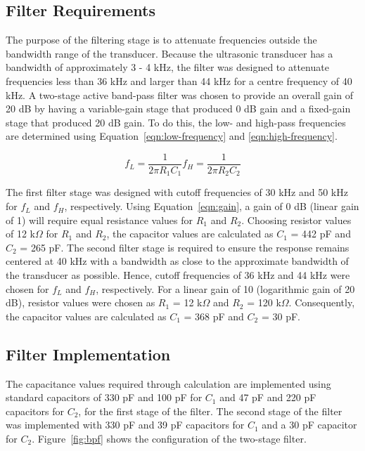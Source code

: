 \documentclass[class=report,11pt,crop=false]{standalone}
\begin{document}
\subsection{Filter Requirements}
The purpose of the filtering stage is to attenuate frequencies outside the bandwidth range of the transducer. Because the ultrasonic transducer has a bandwidth of approximately 3 - 4 kHz, the filter was designed to attenuate frequencies less than 36 kHz and larger than 44 kHz for a centre frequency of 40 kHz. A two-stage active band-pass filter was chosen to provide an overall gain of 20 dB by having a variable-gain stage that produced 0 dB gain and a fixed-gain stage that produced 20 dB gain. To do this, the low- and high-pass frequencies are determined using Equation~\ref{eqn:low-frequency} and \ref{eqn:high-frequency}.

\begin{subequations}
\begin{equation}
    f_L = \frac{1}{2\pi R_1 C_1}
    \label{eqn:low-frequency}
\end{equation}
\begin{equation}
    f_H = \frac{1}{2\pi R_2 C_2}
    \label{eqn:high-frequency}
\end{equation}
\end{subequations}

The first filter stage was designed with cutoff frequencies of 30 kHz and 50 kHz for $f_L$ and $f_H$, respectively. Using Equation~\ref{eqn:gain}, a gain of 0 dB (linear gain of 1) will require equal resistance values for $R_1$ and $R_2$. Choosing resistor values of 12 k$\Omega$ for $R_1$ and $R_2$, the capacitor values are calculated as $C_1$ = 442 pF and $C_2$ = 265 pF. The second filter stage is required to ensure the response remains centered at 40 kHz with a bandwidth as close to the approximate bandwidth of the transducer as possible. Hence, cutoff frequencies of 36 kHz and 44 kHz were chosen for $f_L$ and  $f_H$, respectively. For a linear gain of 10 (logarithmic gain of 20 dB), resistor values were chosen as $R_1$ = 12 k$\Omega$ and $R_2$ = 120 k$\Omega$. Consequently, the capacitor values are calculated as $C_1$ = 368 pF and $C_2$ = 30  pF.

\subsection{Filter Implementation}
The capacitance values required through calculation are implemented using standard capacitors of 330 pF and 100 pF for $C_1$ and 47 pF and 220 pF capacitors for $C_2$, for the first stage of the filter. The second stage of the filter was implemented with 330 pF and 39 pF capacitors for $C_1$ and a 30 pF capacitor for $C_2$. Figure~\ref{fig:bpf} shows the configuration of the two-stage filter.
\end{document}
